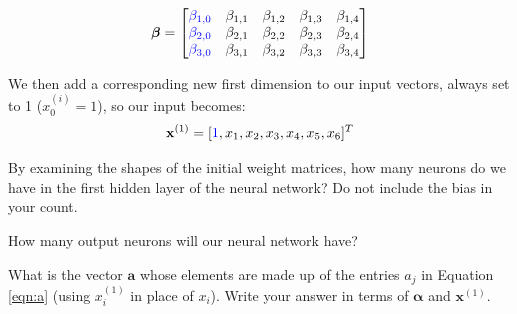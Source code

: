 \documentclass[11pt,addpoints,answers]{exam}
\newcommand{\av}{\mathbf{a}}
\newcommand{\xv}{\mathbf{x}}
\begin{document}
\begin{questions}
\begin{parts}
$$\boldsymbol{\beta}=
    \begin{bmatrix}
    \textcolor{blue}{\beta_{1,0}} & \beta_{1,1} & \beta_{1,2} & \beta_{1,3} & \beta_{1,4} \\
    \textcolor{blue}{\beta_{2,0}} & \beta_{2,1} & \beta_{2,2} & \beta_{2,3} & \beta_{2,4} \\
    \textcolor{blue}{\beta_{3,0}} & \beta_{3,1} & \beta_{3,2} & \beta_{3,3} & \beta_{3,4}
    \end{bmatrix}$$

    We then add a corresponding new first dimension to our input vectors, always set to 1 ($x_0^{(i)} = 1$), so our input becomes: $$\xv^{(1)}=[\textcolor{blue}{1},x_1,x_2,x_3,x_4,x_5,x_6]^T$$
    
    
    \begin{subparts}
        \subpart[1] By examining the shapes of the initial weight matrices, how many neurons do we have in the first hidden layer of the neural network? Do not include the bias in your count.
        
        \begin{your_solution}[title=Answer,height=2cm,width=4cm]
        \end{your_solution}
        
        \subpart[1] How many output neurons will our neural network have?
        
        \begin{your_solution}[title=Answer,height=2cm,width=4cm]
        \end{your_solution}
        
        \clearpage
        
        \subpart[1] What is the vector $\av$ whose elements are made up of the entries $a_j$ in Equation \ref{eqn:a} (using $x^{(1)}_i$ in place of $x_i$). Write your answer in terms of $\bm{\alpha}$ and $\xv^{(1)}$.
        
        \begin{your_solution}[title=Answer,height=2cm,width=4cm]
        \end{your_solution}
        

\end{subparts}
\end{parts}
\end{questions}
\end{document}
